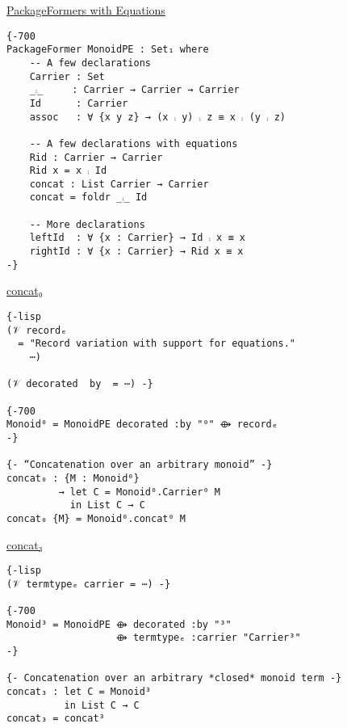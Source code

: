 \documentclass[sigplan,screen]{acmart}
\begin{document}
\uline{PackageFormers with Equations}
\begin{verbatim}
{-700
PackageFormer MonoidPE : Set₁ where
    -- A few declarations
    Carrier : Set
    _⨾_     : Carrier → Carrier → Carrier
    Id      : Carrier
    assoc   : ∀ {x y z} → (x ⨾ y) ⨾ z ≡ x ⨾ (y ⨾ z)

    -- A few declarations with equations
    Rid : Carrier → Carrier
    Rid x = x ⨾ Id
    concat : List Carrier → Carrier
    concat = foldr _⨾_ Id

    -- More declarations
    leftId  : ∀ {x : Carrier} → Id ⨾ x ≡ x
    rightId : ∀ {x : Carrier} → Rid x ≡ x
-}
\end{verbatim}

\uline{concat₀}
\begin{verbatim}
{-lisp
(𝒱 recordₑ
  = "Record variation with support for equations."
    ⋯)

(𝒱 decorated  by  = ⋯) -}

{-700
Monoid⁰ = MonoidPE decorated :by "⁰" ⟴ recordₑ
-}

{- “Concatenation over an arbitrary monoid” -}
concat₀ : {M : Monoid⁰}
         → let C = Monoid⁰.Carrier⁰ M
           in List C → C
concat₀ {M} = Monoid⁰.concat⁰ M
\end{verbatim}

\vspace{0.3em}
\uline{concat₃}
\begin{verbatim}
{-lisp
(𝒱 termtypeₑ carrier = ⋯) -}

{-700
Monoid³ = MonoidPE ⟴ decorated :by "³"
                   ⟴ termtypeₑ :carrier "Carrier³"
-}

{- Concatenation over an arbitrary *closed* monoid term -}
concat₃ : let C = Monoid³
          in List C → C
concat₃ = concat³
\end{verbatim}
\end{document}
